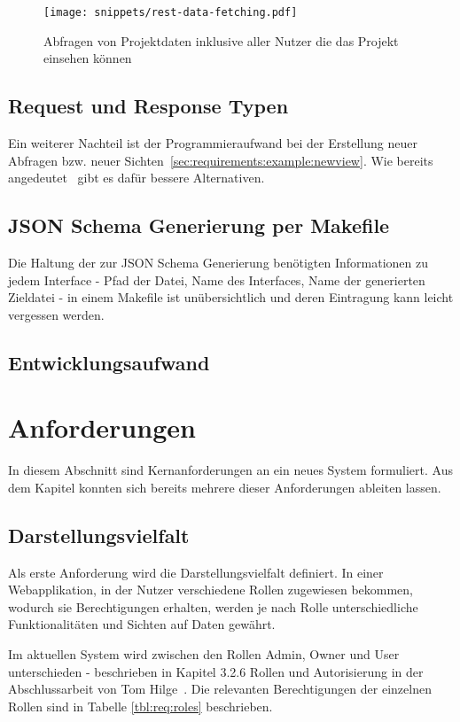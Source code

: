 \begin{figure}[h!]
    \centering
    \texttt{[image: snippets/rest-data-fetching.pdf]}
    \caption{Abfragen von Projektdaten inklusive aller Nutzer die das Projekt einsehen können}
    \label{req:neg:rest-data-fetching}
\end{figure}


\subsection{Request und Response Typen}
Ein weiterer Nachteil ist der Programmieraufwand bei der Erstellung neuer Abfragen bzw. neuer Sichten~\ref{sec:requirements:example:newview}.
Wie bereits angedeutet~\cite{tbl:newview} gibt es dafür bessere Alternativen.

\subsection{JSON Schema Generierung per Makefile}
Die Haltung der zur JSON Schema Generierung benötigten Informationen zu jedem Interface - Pfad der Datei, Name des Interfaces, Name der generierten Zieldatei -
in einem Makefile ist unübersichtlich und deren Eintragung kann leicht vergessen werden.

\subsection{Entwicklungsaufwand}

\section{Anforderungen}
\label{sec:requirements:req}
In diesem Abschnitt sind Kernanforderungen an ein neues System formuliert.
Aus dem Kapitel  konnten sich bereits mehrere dieser Anforderungen ableiten lassen.

\subsection{Darstellungsvielfalt}
\label{sec:requirements:req:view}
Als erste Anforderung wird die Darstellungsvielfalt definiert.
In einer Webapplikation, in der Nutzer verschiedene Rollen zugewiesen bekommen, wodurch sie Berechtigungen erhalten,
werden je nach Rolle unterschiedliche Funktionalitäten und Sichten auf Daten gewährt.

Im aktuellen System wird zwischen den Rollen Admin, Owner und User unterschieden - beschrieben in Kapitel 3.2.6 Rollen und Autorisierung
in der Abschlussarbeit von Tom Hilge~\cite{Abschlussarbeit-Tom-Hilge}.
Die relevanten Berechtigungen der einzelnen Rollen sind in Tabelle \ref{tbl:req:roles} beschrieben.

